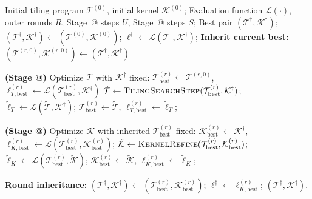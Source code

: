 \documentclass{article}
\makeatletter
\theoremstyle{plain}
\theoremstyle{definition}
\theoremstyle{remark}
\newcommand{\Rmnum}[1]{\expandafter\@slowromancap\romannumeral #1@}
\makeatother
\begin{document}
\begin{algorithm}[!t]
\small
\setlength{\abovecaptionskip}{2pt}
\setlength{\belowcaptionskip}{2pt}
\caption{AscendOptimizer}
\label{alg:alternating_optimization}
\begin{algorithmic}[1]
\Require Initial tiling program $\mathcal{T}^{(0)}$, initial kernel $\mathcal{K}^{(0)}$;
\Require Evaluation function $\mathcal{L}(\cdot)$, outer rounds $R$, Stage~\Rmnum{1} steps $U$, Stage~\Rmnum{2} steps $S$;
\Output Best pair $(\mathcal{T}^{\dagger}, \mathcal{K}^{\dagger})$;
\State $(\mathcal{T}^{\dagger}, \mathcal{K}^{\dagger}) \gets (\mathcal{T}^{(0)}, \mathcal{K}^{(0)})$;
\State $\ell^{\dagger} \gets \mathcal{L}(\mathcal{T}^{\dagger}, \mathcal{K}^{\dagger})$;
    \State \textbf{Inherit current best:} $(\mathcal{T}^{(r,0)}, \mathcal{K}^{(r,0)}) \gets (\mathcal{T}^{\dagger}, \mathcal{K}^{\dagger})$

    \State \textbf{(Stage \Rmnum{1})} Optimize $\mathcal{T}$ with $\mathcal{K}^{\dagger}$ fixed:
    \State $\mathcal{T}_{\text{best}}^{(r)} \gets \mathcal{T}^{(r,0)}$, $\ell_{T,\text{best}}^{(r)} \gets \mathcal{L}(\mathcal{T}_{\text{best}}^{(r)}, \mathcal{K}^{\dagger})$
        \State $\tilde{\mathcal{T}} \gets \textsc{TilingSearchStep}(\mathcal{T}_{\text{best}}^{(r)}, \mathcal{K}^{\dagger})$;
            \State $\tilde{\ell}_T \gets \mathcal{L}(\tilde{\mathcal{T}}, \mathcal{K}^{\dagger})$;
                \State $\mathcal{T}_{\text{best}}^{(r)} \gets \tilde{\mathcal{T}}$, $\ell_{T,\text{best}}^{(r)} \gets \tilde{\ell}_T$;
            \EndIf
        \EndIf
    \EndFor

    \State \textbf{(Stage \Rmnum{2})} Optimize $\mathcal{K}$ with inherited $\mathcal{T}_{\text{best}}^{(r)}$ fixed:
    \State $\mathcal{K}_{\text{best}}^{(r)} \gets \mathcal{K}^{\dagger}$, $\ell_{K,\text{best}}^{(r)} \gets \mathcal{L}(\mathcal{T}_{\text{best}}^{(r)}, \mathcal{K}_{\text{best}}^{(r)})$;
        \State $\tilde{\mathcal{K}} \gets \textsc{KernelRefine}(\mathcal{T}_{\text{best}}^{(r)}, \mathcal{K}_{\text{best}}^{(r)})$;
            \State $\tilde{\ell}_K \gets \mathcal{L}(\mathcal{T}_{\text{best}}^{(r)}, \tilde{\mathcal{K}})$;
                \State $\mathcal{K}_{\text{best}}^{(r)} \gets \tilde{\mathcal{K}}$, $\ell_{K,\text{best}}^{(r)} \gets \tilde{\ell}_K$;
            \EndIf
        \EndIf
    \EndFor

    \State \textbf{Round inheritance:} $(\mathcal{T}^{\dagger}, \mathcal{K}^{\dagger}) \gets (\mathcal{T}_{\text{best}}^{(r)}, \mathcal{K}_{\text{best}}^{(r)})$;
    \State $\ell^{\dagger} \gets \ell_{K,\text{best}}^{(r)}$;
\EndFor
\State \Return $(\mathcal{T}^{\dagger}, \mathcal{K}^{\dagger})$.
\end{algorithmic}
\end{algorithm}
\end{document}
